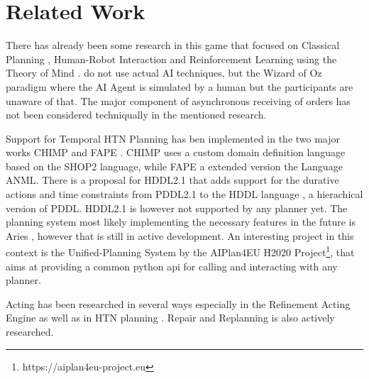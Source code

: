\section{Related Work}

There has already been some research in this game that focused on Classical Planning \citep{yuxinliuPlanningOvercookedGame2020}, Human-Robot Interaction \citep{bishopCHAOPTTestbedEvaluating2020,roseroTwoManyCooks2021,ruhdorferMindsChefsUsing2023} and Reinforcement Learning using the Theory of Mind \citep{ruhdorferMindsChefsUsing2023}.
\cite{bishopCHAOPTTestbedEvaluating2020,roseroTwoManyCooks2021} do not use actual AI techniques, but the Wizard of Oz paradigm where the AI Agent is simulated by a human but the participants are unaware of that.
The major component of asynchronous receiving of orders has not been considered techniqually in the mentioned research.

Support for Temporal HTN Planning has ben implemented in the two major works CHIMP \citep{stockHierarchicalHybridPlanning2017} and FAPE \citep{bit-monnotFAPEConstraintbasedPlanner2020}.
CHIMP uses a custom domain definition language based on the SHOP2 language, while FAPE a extended version the Language ANML.
There is a proposal for HDDL2.1 \citep{pellierHDDLDefiningFormalism2023} that adds support for the durative actions and time constraints from PDDL2.1 \citep{foxPDDL2ExtensionPDDL2003} to the HDDL language \citep{hollerHDDLExtensionPDDL2020}, a hierachical version of PDDL.
HDDL2.1 is however not supported by any planner yet.
The planning system most likely implementing the necessary features in the future is Aries \citep{bit-monnotAries2024}, however that is still in active development.
An interesting project in this context is the Unified-Planning System \citep{frambaUnifiedPlanning2024} by the AIPlan4EU H2020 Project\footnote{https://aiplan4eu-project.eu}, that aims at providing a common python api for calling and interacting with any planner.

Acting has been researched in several ways especially in the Refinement Acting Engine \citep{ghallabAutomatedPlanningActing2016,more} as well as in HTN planning \citep{bit-monnotTemporalHierarchicalModels2017,desilvaHTNActingFormalism2018,patraIntegratingActingPlanning2020,bansodIntegratingPlanningActing2021}.
Repair and Replanning \citep{bansodHTNReplanningMiddle2022} is also actively researched.
